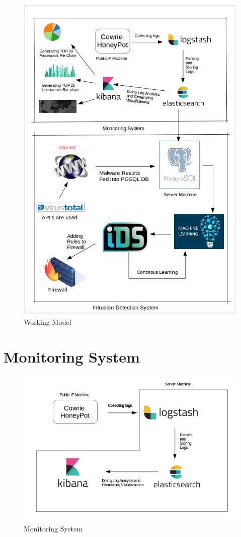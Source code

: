 \documentclass{report}
\begin{document}
\begin{figure}[H]
\centering
\caption{Working Model}
\includegraphics[scale=0.55]{Working_Model}
\end{figure}

\section{Monitoring System}

\begin{figure}[H]
\centering
\caption{Monitoring System}
\includegraphics[scale=0.55]{Monitoring_System}
\end{figure}
\end{document}
